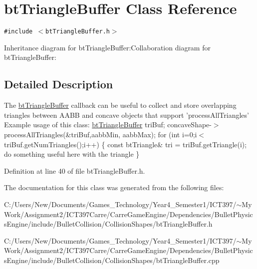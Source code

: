 \hypertarget{classbt_triangle_buffer}{
\section{btTriangleBuffer Class Reference}
\label{classbt_triangle_buffer}
}
{\tt \#include $<$btTriangleBuffer.h$>$}

Inheritance diagram for btTriangleBuffer:Collaboration diagram for btTriangleBuffer:

\subsection{Detailed Description}
The \hyperlink{classbt_triangle_buffer}{btTriangleBuffer} callback can be useful to collect and store overlapping triangles between AABB and concave objects that support 'processAllTriangles' Example usage of this class: \hyperlink{classbt_triangle_buffer}{btTriangleBuffer} triBuf; concaveShape-$>$processAllTriangles(\&triBuf,aabbMin, aabbMax); for (int i=0;i$<$triBuf.getNumTriangles();i++) \{ const btTriangle\& tri = triBuf.getTriangle(i); do something useful here with the triangle \} 

Definition at line 40 of file btTriangleBuffer.h.

The documentation for this class was generated from the following files:\begin{CompactItemize}
\item 
C:/Users/New/Documents/Games\_\-Technology/Year4\_\-Semester1/ICT397/$\sim$My Work/Assignment2/ICT397Carre/CarreGameEngine/Dependencies/BulletPhysicsEngine/include/BulletCollision/CollisionShapes/btTriangleBuffer.h\item 
C:/Users/New/Documents/Games\_\-Technology/Year4\_\-Semester1/ICT397/$\sim$My Work/Assignment2/ICT397Carre/CarreGameEngine/Dependencies/BulletPhysicsEngine/include/BulletCollision/CollisionShapes/btTriangleBuffer.cpp\end{CompactItemize}
